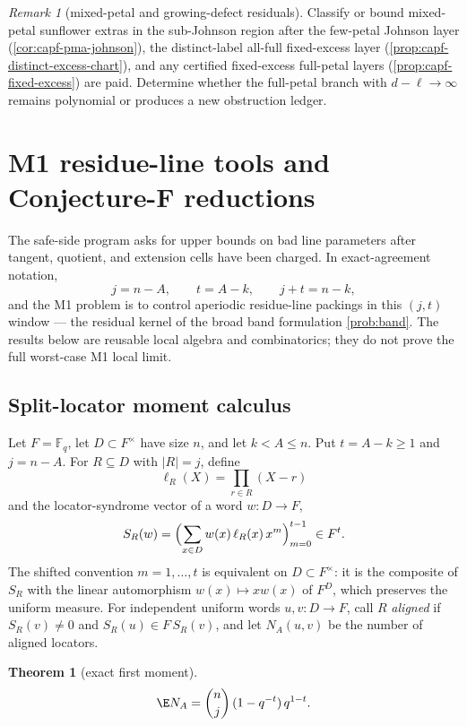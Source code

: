 \documentclass[11pt]{article}
\newtheorem{theorem}{Theorem}[section]
\theoremstyle{definition}
\theoremstyle{remark}
\newtheorem{remark}[remark]{Remark}
\newcommand{\F}{\mathbb{F}}
\begin{document}
\begin{remark}[mixed-petal and growing-defect residuals]\label{prob:capf-l1-residuals}
Classify or bound mixed-petal sunflower extras in the sub-Johnson region after the few-petal Johnson layer \textup{(\cref{cor:capf-pma-johnson})}, the distinct-label all-full fixed-excess layer \textup{(\cref{prop:capf-distinct-excess-chart})}, and any certified fixed-excess full-petal layers \textup{(\cref{prop:capf-fixed-excess})} are paid.  Determine whether the full-petal branch with $d-\ell\to\infty$ remains polynomial or produces a new obstruction ledger.
\end{remark}

\section{M1 residue-line tools and Conjecture-F reductions}\label{sec:capf-m1}

The safe-side program asks for upper bounds on bad line parameters after tangent, quotient, and extension cells have been charged.  In exact-agreement notation,
\[
        j=n-A,
        \qquad
        t=A-k,
        \qquad
        j+t=n-k,
\]
and the M1 problem is to control aperiodic residue-line packings in this $(j,t)$ window --- the residual kernel of the broad band formulation \cref{prob:band}.  The results below are reusable local algebra and combinatorics; they do not prove the full worst-case M1 local limit.

\subsection{Split-locator moment calculus}

Let $F=\F_q$, let $D\subset F^\times$ have size $n$, and let $k<A\le n$.  Put $t=A-k\ge1$ and $j=n-A$.  For $R\subseteq D$ with $|R|=j$, define
\[
        \ell_R(X)=\prod_{r\in R}(X-r)
\]
and the locator-syndrome vector of a word $w:D\to F$,
\[
        S_R(w)=
        \Bigl(\sum_{x\in D}w(x)\,\ell_R(x)\,x^m\Bigr)_{m=0}^{t-1}
        \in F^t .
\]
The shifted convention $m=1,\ldots,t$ is equivalent on $D\subset F^\times$: it is the composite of $S_R$ with the linear automorphism $w(x)\mapsto xw(x)$ of $F^D$, which preserves the uniform measure.  For independent uniform words $u,v:D\to F$, call $R$ \emph{aligned} if $S_R(v)\ne0$ and $S_R(u)\in F\,S_R(v)$, and let $N_A(u,v)$ be the number of aligned locators.

\begin{theorem}[exact first moment]\label{thm:capf-first-moment}
\[
        \E N_A
        =
        \binom{n}{j}\,(1-q^{-t})\,q^{1-t}.
\]
\end{theorem}
\end{document}
